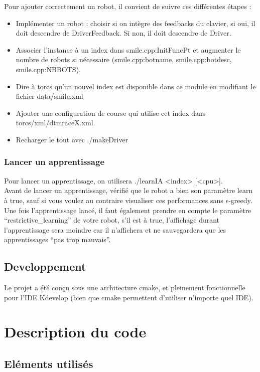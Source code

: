 \documentclass[a4paper,12pt]{article}
\begin{document}
  Pour ajouter correctement un robot, il convient de suivre ces différentes étapes :
    \begin{itemize}
      \item Implémenter un robot : choisir si on intègre des feedbacks du clavier, si oui, il doit descendre de DriverFeedback.
   Si non, il doit descendre de Driver.
      \item Associer l'instance à un index dans smile.cpp:InitFuncPt et augmenter le nombre de robots si nécessaire
      (smile.cpp:botname, smile.cpp:botdesc, smile.cpp:NBBOTS).
      \item Dire à torcs qu'un nouvel index est disponible dans ce module en modifiant le fichier data/smile.xml
      \item Ajouter une configuration de course qui utilise cet index dans torcs/xml/dtmraceX.xml.
      \item Recharger le tout avec ./makeDriver
  \end{itemize}

  
  \subsubsection{Lancer un apprentissage}
  
  Pour lancer un apprentissage, on utilisera ./learnIA <index> [<cpu>]. \\[0.4cm]
  Avant de lancer un apprentissage, vérifié que le robot a bien son paramètre learn à true, 
  sauf si vous voulez au contraire visualiser ces performances sans $\epsilon$-greedy.\\[0.4cm]
  Une fois l'apprentissage lancé, il faut également prendre en compte le paramètre ``restrictive\_learning''
  de votre robot, s'il est à true, l'affichage durant l'apprentissage sera moindre car il n'affichera
  et ne sauvegardera que les apprentissages ``pas trop mauvais''.
  
  
  \subsection{Developpement}
  Le projet a été conçu sous une architecture cmake, et pleinement fonctionnelle pour l'IDE Kdevelop (bien que cmake
  permettent d'utiliser n'importe quel IDE).
  
  \section{Description du code}
    \subsection{Eléments utilisés}
\end{document}
